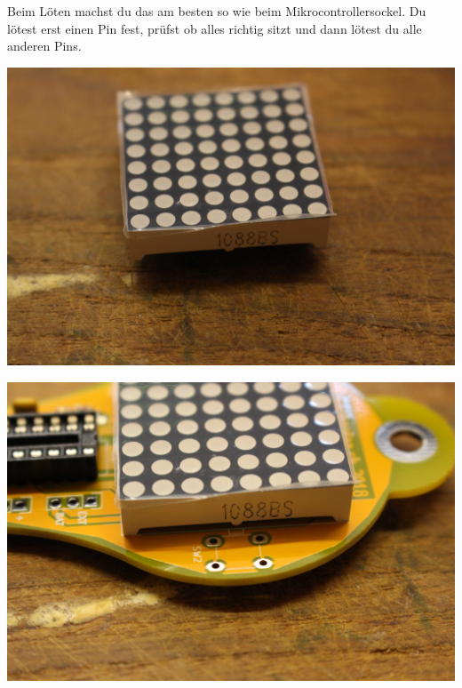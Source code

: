 \documentclass{article}
\begin{document}
Beim Löten machst du das am besten so wie beim Mikrocontrollersockel. Du lötest erst einen Pin fest, prüfst ob alles richtig sitzt und dann lötest du alle anderen Pins.

\begin{minipage}[b]{0.5\textwidth}
	\includegraphics[width=\textwidth]{Bilder/IMG_5577.JPG}
	\label{fig:}
\end{minipage}
\begin{minipage}[b]{0.5\textwidth}
	\includegraphics[width=\textwidth]{Bilder/IMG_5578.JPG}
	\label{fig:}
\end{minipage}
\end{document}
